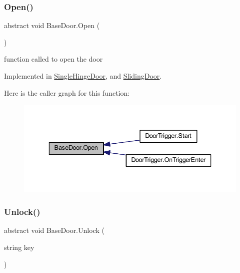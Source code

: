 \subsubsection{\texorpdfstring{Open()}{Open()}}
{\footnotesize\ttfamily abstract void Base\+Door.\+Open (\begin{DoxyParamCaption}{ }\end{DoxyParamCaption})\hspace{0.3cm}{\ttfamily [pure virtual]}}



function called to open the door 



Implemented in \mbox{\hyperlink{class_single_hinge_door_ad48e670701a9e9d35f97de3b8ff36208}{Single\+Hinge\+Door}}, and \mbox{\hyperlink{class_sliding_door_aaf090e96cc143eb5ed3eaf875045efc9}{Sliding\+Door}}.

Here is the caller graph for this function\+:
\nopagebreak
\begin{figure}[H]
\begin{center}
\leavevmode
\includegraphics[width=336pt]{class_base_door_a418df6f73cc5c56b6989c0512a6a909b_icgraph}
\end{center}
\end{figure}
\mbox{\label{class_base_door_a1fe85317a4742aec4d03deb7c0d52fd2}} 
\subsubsection{\texorpdfstring{Unlock()}{Unlock()}}
{\footnotesize\ttfamily abstract void Base\+Door.\+Unlock (\begin{DoxyParamCaption}\item[{string}]{key }\end{DoxyParamCaption})\hspace{0.3cm}{\ttfamily [pure virtual]}}



